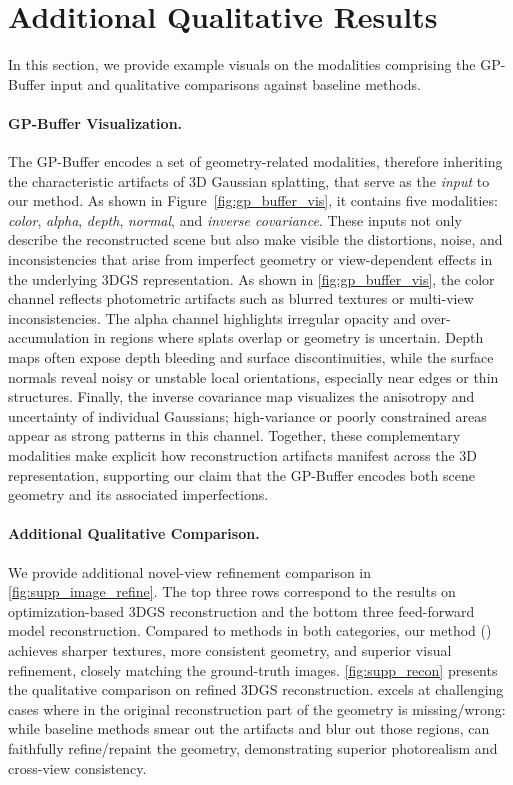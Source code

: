 \section{Additional Qualitative Results}
\label{supp:add_results}
In this section, we provide example visuals on the modalities comprising the GP-Buffer input and qualitative comparisons against baseline methods. 

\paragraph{GP-Buffer Visualization.}
The GP-Buffer encodes a set of geometry-related modalities, therefore inheriting the characteristic artifacts of 3D Gaussian splatting, that serve as the \emph{input} to our method. As shown in Figure~\ref{fig:gp_buffer_vis}, it contains five modalities: \textit{color}, \textit{alpha}, \textit{depth}, \textit{normal}, and \textit{inverse covariance}. These inputs not only describe the reconstructed scene but also make visible the distortions, noise, and inconsistencies that arise from imperfect geometry or view-dependent effects in the underlying 3DGS representation.
As shown in \cref{fig:gp_buffer_vis}, the color channel reflects photometric artifacts such as blurred textures or multi-view inconsistencies. The alpha channel highlights irregular opacity and over-accumulation in regions where splats overlap or geometry is uncertain. Depth maps often expose depth bleeding and surface discontinuities, while the surface normals reveal noisy or unstable local orientations, especially near edges or thin structures. Finally, the inverse covariance map visualizes the anisotropy and uncertainty of individual Gaussians; high-variance or poorly constrained areas appear as strong patterns in this channel. Together, these complementary modalities make explicit how reconstruction artifacts manifest across the 3D representation, supporting our claim that the GP-Buffer encodes both scene geometry and its associated imperfections.


\paragraph{Additional Qualitative Comparison.}
We provide additional novel-view refinement comparison in \cref{fig:supp_image_refine}. The top three rows correspond to the results on optimization-based 3DGS reconstruction and the bottom three feed-forward model reconstruction.
Compared to methods in both categories, our method (\ours) achieves sharper textures, more consistent geometry, and superior visual refinement, closely matching the ground-truth images. \cref{fig:supp_recon} presents the qualitative comparison on refined 3DGS reconstruction. \ours excels at challenging cases where in the original reconstruction part of the geometry is missing/wrong: while baseline methods smear out the artifacts and blur out those regions, \ours can faithfully refine/repaint the geometry, demonstrating superior photorealism and cross-view consistency.

